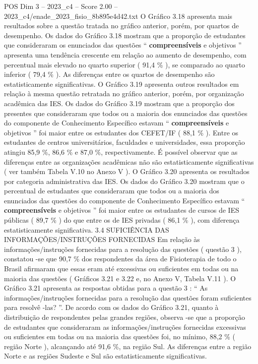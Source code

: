 \begin{textsample}{POS Dim 3 – 2023\_c4 – Score 2.00 – 2023\_c4/enade\_2023\_fisio\_8b895e4d42.txt}
O Gráfico 3.18 apresenta mais resultados sobre a questão tratada no gráfico anterior, porém, por quartos de desempenho.
Os dados do Gráfico 3.18 mostram que a proporção de estudantes que consideraram os enunciados das questões “ \textbf{compreensíveis} e objetivos ” apresenta uma tendência crescente em relação ao aumento de desempenho, com percentual mais elevado no quarto superior ( 91,4 \% ), se comparado ao quarto inferior ( 79,4 \% ).
As diferenças entre os quartos de desempenho são estatisticamente significativas.
O Gráfico 3.19 apresenta outros resultados em relação à mesma questão retratada no gráfico anterior, porém, por organização acadêmica das IES.
Os dados do Gráfico 3.19 mostram que a proporção dos presentes que consideraram que todos ou a maioria dos enunciados das questões do componente de Conhecimento Específico estavam “ \textbf{compreensíveis} e objetivos ” foi maior entre os estudantes dos CEFET/IF ( 88,1 \% ).
Entre os estudantes de centros universitários, faculdades e universidades, essa proporção atingiu 85,9 \%, 86,6 \% e 87,0 \%, respectivamente.
É possível observar que as diferenças entre as organizações acadêmicas não são estatisticamente significativas ( ver também Tabela V.10 no Anexo V ).
O Gráfico 3.20 apresenta os resultados por categoria administrativa das IES.
Os dados do Gráfico 3.20 mostram que o percentual de estudantes que consideraram que todos ou a maioria dos enunciados das questões do componente de Conhecimento Específico estavam “ \textbf{compreensíveis} e objetivos ” foi maior entre os estudantes de cursos de IES públicas ( 89,7 \% ) do que entre os de IES privadas ( 86,1 \% ), com diferença estatisticamente significativa. 3.4 SUFICIÊNCIA DAS INFORMAÇÕES/INSTRUÇÕES FORNECIDAS Em relação às informações/instruções fornecidas para a resolução das questões ( questão 3 ), constatou -se que 90,7 \% dos respondentes da área de Fisioterapia de todo o Brasil afirmaram que essas eram até excessivas ou suficientes em todas ou na maioria das questões ( Gráficos 3.21 e 3.22 e, no Anexo V, Tabela V.11 ).
O Gráfico 3.21 apresenta as respostas obtidas para a questão 3 : “ As informações/instruções fornecidas para a resolução das questões foram suficientes para resolvê -las? ”.
De acordo com os dados do Gráfico 3.21, quanto à distribuição de respondentes pelas grandes regiões, observa -se que a proporção de estudantes que consideraram as informações/instruções fornecidas excessivas ou suficientes em todas ou na maioria das questões foi, no mínimo, 88,2 \% ( região Norte ), alcançando até 91,6 \%, na região Sul.
As diferenças entre a região Norte e as regiões Sudeste e Sul são estatisticamente significativas.

\end{textsample}
